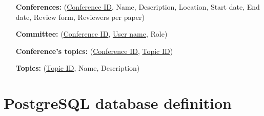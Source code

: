 \documentclass[12pt]{article}
\newcommand{\<}{\langle}
\renewcommand{\>}{\rangle}
\begin{document}
\begin{enumerate}
\item[\textbf{Conferences:}](\underline{Conference ID}, Name, Description, Location, Start date, End date, Review form, Reviewers per paper)

\item[\textbf{Committee:}](\underline{Conference ID}, \underline{User name}, Role)

\item[\textbf{Conference's topics:}](\underline{Conference ID}, \underline{Topic ID})

\item[\textbf{Topics:}](\underline{Topic ID}, Name, Description)
\end{enumerate}

\part{PostgreSQL database definition}
\end{document}
